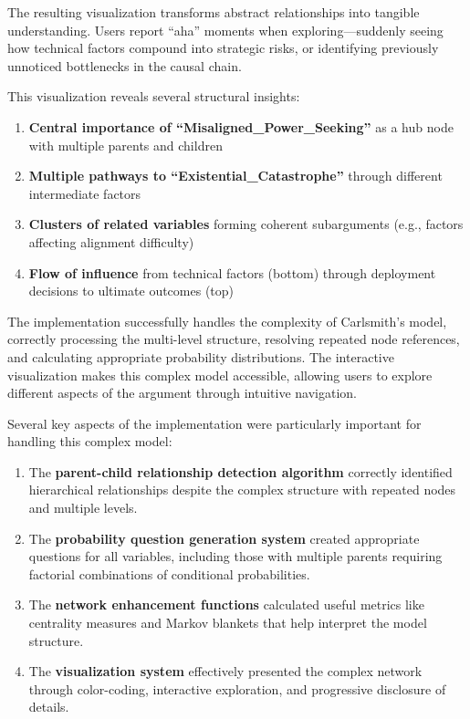 \documentclass[
  11pt,
  letterpaper,
]{book}
\providecommand{\tightlist}{%
  \setlength{\itemsep}{0pt}\setlength{\parskip}{0pt}}
\begin{document}
\begin{landscape}
The resulting visualization transforms abstract relationships into
tangible understanding. Users report ``aha'' moments when
exploring---suddenly seeing how technical factors compound into
strategic risks, or identifying previously unnoticed bottlenecks in the
causal chain.

This visualization reveals several structural insights:

\begin{enumerate}
\def\labelenumi{\arabic{enumi}.}
\tightlist
\item
  \textbf{Central importance of ``Misaligned\_Power\_Seeking''} as a hub
  node with multiple parents and children
\item
  \textbf{Multiple pathways to ``Existential\_Catastrophe''} through
  different intermediate factors
\item
  \textbf{Clusters of related variables} forming coherent subarguments
  (e.g., factors affecting alignment difficulty)
\item
  \textbf{Flow of influence} from technical factors (bottom) through
  deployment decisions to ultimate outcomes (top)
\end{enumerate}

The implementation successfully handles the complexity of Carlsmith's
model, correctly processing the multi-level structure, resolving
repeated node references, and calculating appropriate probability
distributions. The interactive visualization makes this complex model
accessible, allowing users to explore different aspects of the argument
through intuitive navigation.

Several key aspects of the implementation were particularly important
for handling this complex model:

\begin{enumerate}
\def\labelenumi{\arabic{enumi}.}
\item
  The \textbf{parent-child relationship detection algorithm} correctly
  identified hierarchical relationships despite the complex structure
  with repeated nodes and multiple levels.
\item
  The \textbf{probability question generation system} created
  appropriate questions for all variables, including those with multiple
  parents requiring factorial combinations of conditional probabilities.
\item
  The \textbf{network enhancement functions} calculated useful metrics
  like centrality measures and Markov blankets that help interpret the
  model structure.
\item
  The \textbf{visualization system} effectively presented the complex
  network through color-coding, interactive exploration, and progressive
  disclosure of details.
\end{enumerate}


\end{landscape}
\end{document}
